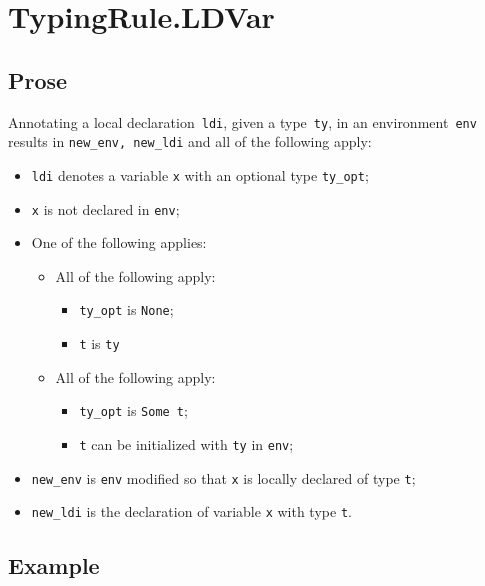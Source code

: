 \documentclass{book}
\begin{document}

\section{TypingRule.LDVar \label{sec:TypingRule.LDVar}}

  \subsection{Prose}
    Annotating a local declaration~\texttt{ldi}, given a type~\texttt{ty}, in
an environment~\texttt{env} results in \texttt{new\_env, new\_ldi} and all of
the following apply:
   \begin{itemize}
   \item \texttt{ldi} denotes a variable \texttt{x} with an optional type \texttt{ty\_opt};
   \item \texttt{x} is not declared in \texttt{env};
   \item One of the following applies:
     \begin{itemize}
     \item All of the following apply:
       \begin{itemize}
       \item \texttt{ty\_opt} is \texttt{None};
       \item \texttt{t} is \texttt{ty}
       \end{itemize}
     \item All of the following apply:
       \begin{itemize}
       \item \texttt{ty\_opt} is \texttt{Some t};
       \item \texttt{t} can be initialized with \texttt{ty} in \texttt{env};
       \end{itemize}
     \end{itemize}
   \item \texttt{new\_env} is \texttt{env} modified so that \texttt{x} is locally declared of type \texttt{t};
   \item \texttt{new\_ldi} is the declaration of variable \texttt{x} with type \texttt{t}.
   \end{itemize}

  \subsection{Example}
\end{document}
